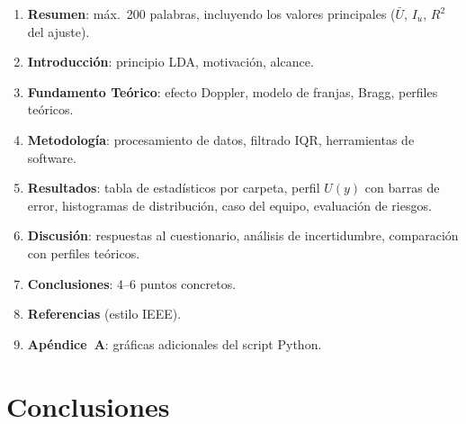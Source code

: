 \documentclass[12pt,a4paper]{article}
\begin{document}
\begin{enumerate}
	\item \textbf{Resumen}: máx.\ 200 palabras, incluyendo los valores
	      principales ($\bar{U}$, $I_u$, $R^2$ del ajuste).
	\item \textbf{Introducción}: principio LDA, motivación, alcance.
	\item \textbf{Fundamento Teórico}: efecto Doppler, modelo de franjas,
	      Bragg, perfiles teóricos.
	\item \textbf{Metodología}: procesamiento de datos, filtrado IQR,
	      herramientas de software.
	\item \textbf{Resultados}: tabla de estadísticos por carpeta, perfil
	      $U(y)$ con barras de error, histogramas de distribución, caso del
	      equipo, evaluación de riesgos.
	\item \textbf{Discusión}: respuestas al cuestionario, análisis de
	      incertidumbre, comparación con perfiles teóricos.
	\item \textbf{Conclusiones}: 4--6 puntos concretos.
	\item \textbf{Referencias} (estilo IEEE).
	\item \textbf{Apéndice~A}: gráficas adicionales del script Python.
\end{enumerate}

\section{Conclusiones}
\label{sec:conclusiones}
\end{document}
